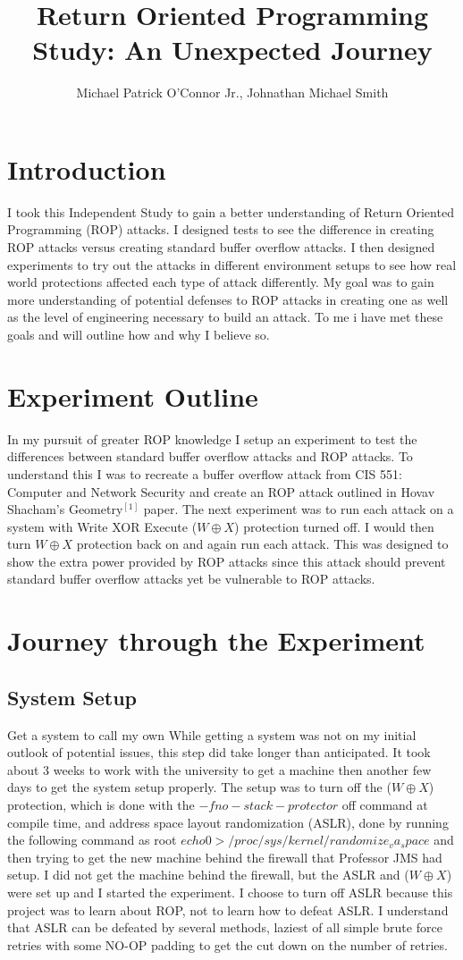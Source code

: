 \documentclass[11pt]{amsart}
\title{Return Oriented Programming Study: \newline An Unexpected Journey}
\author{Michael Patrick O'Connor Jr., Johnathan Michael Smith}
\date{}
\begin{document}
\maketitle

\newpage
\section*{Introduction}
I took this Independent Study to gain a better understanding of Return Oriented Programming (ROP) attacks. I designed tests to see the difference in creating ROP attacks versus creating standard buffer overflow attacks. I then designed experiments to try out the attacks in different environment setups to see how real world protections affected each type of attack differently. My goal was to gain more understanding of potential defenses to ROP attacks in creating one as well as the level of engineering necessary to build an attack. To me i have met these goals and will outline how and why I believe so.
\section*{Experiment Outline}
In my pursuit of greater ROP knowledge I setup an experiment to test the differences between standard buffer overflow attacks and ROP attacks. To understand this I was to recreate a buffer overflow attack from CIS 551: Computer and Network Security and create an ROP attack outlined in Hovav Shacham's Geometry$^[1]$ paper.
The next experiment was to run each attack on a system with Write XOR Execute ($W \oplus X$) protection turned off. I would then turn $W \oplus X$ protection back on and again run each attack. This was designed to show the extra power provided by ROP attacks since this attack should prevent standard buffer overflow attacks yet be vulnerable to ROP attacks.
\section*{Journey through the Experiment}
\subsection*{System Setup}
Get a system to call my own
While getting a system was not on my initial outlook of potential issues, this step did take longer than anticipated. It took about 3 weeks to work with the university to get a machine then another few days to get the system setup properly. The setup was to turn off the ($W \oplus X$) protection, which is done with the $-fno-stack-protector$ off command at compile time, and address space layout randomization (ASLR), done by running the following command as root $echo 0 > /proc/sys/kernel/randomize_va_space$ and then trying to get the new machine behind the firewall that Professor JMS had setup. I did not get the machine behind the firewall, but the ASLR and ($W \oplus X$) were set up and I started the experiment.
I choose to turn off ASLR because this project was to learn about ROP, not to learn how to defeat ASLR. I understand that ASLR can be defeated by several methods, laziest of all simple brute force retries with some NO-OP padding to get the cut down on the number of retries.
\end{document}
